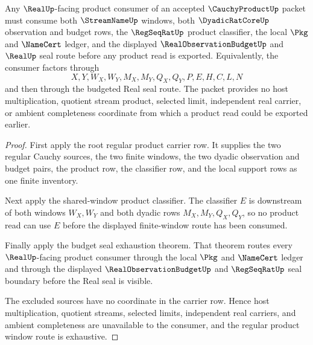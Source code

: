 
\begin{theorem}
\label{thm:cauchy-product-regular-product-window-exhaustion}
Any $\RealUp$-facing product consumer of an accepted $\CauchyProductUp$ packet must consume both $\StreamNameUp$ windows, both $\DyadicRatCoreUp$ observation and budget rows, the $\RegSeqRatUp$ product classifier, the local $\Pkg$ and $\NameCert$ ledger, and the displayed $\RealObservationBudgetUp$ and $\RealUp$ seal route before any product read is exported. Equivalently, the consumer factors through
$$
X,Y,W_X,W_Y,M_X,M_Y,Q_X,Q_Y,P,E,H,C,L,N
$$
and then through the budgeted Real seal route. The packet provides no host multiplication, quotient stream product, selected limit, independent real carrier, or ambient completeness coordinate from which a product read could be exported earlier.
\end{theorem}
\begin{proof}
First apply the root regular product carrier row. It supplies the two regular Cauchy sources, the two finite windows, the two dyadic observation and budget pairs, the product row, the classifier row, and the local support rows as one finite inventory.

Next apply the shared-window product classifier. The classifier $E$ is downstream of both windows $W_X,W_Y$ and both dyadic rows $M_X,M_Y,Q_X,Q_Y$, so no product read can use $E$ before the displayed finite-window route has been consumed.

Finally apply the budget seal exhaustion theorem. That theorem routes every $\RealUp$-facing product consumer through the local $\Pkg$ and $\NameCert$ ledger and through the displayed $\RealObservationBudgetUp$ and $\RegSeqRatUp$ seal boundary before the Real seal is visible.

The excluded sources have no coordinate in the carrier row. Hence host multiplication, quotient streams, selected limits, independent real carriers, and ambient completeness are unavailable to the consumer, and the regular product window route is exhaustive.
\end{proof}

